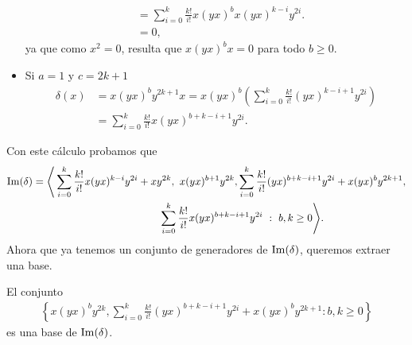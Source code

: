 \documentclass[fleqn,../tesis.tex]{subfiles}
\begin{document}
\begin{itemize}
\begin{align*}
		&= \sum_{i = 0}^k\frac{k!}{i!}x(yx)^bx(yx)^{k - i}y^{2i}. \\
		& = 0,
	\end{align*}
	ya que como $x^2 = 0$, resulta que $x(yx)^bx = 0$ para todo $b \geq 0$.
\item Si $a = 1$ y $c = 2k + 1$
	\begin{align*}
		\delta(x) &= x(yx)^by^{2k + 1}x = x(yx)^b\left( \sum_{i = 0}^k\frac{k!}{i!}(yx)^{k - i + 1}y^{2i}\right) \\
		&= \sum_{i = 0}^k\frac{k!}{i!}x(yx)^{b + k - i + 1}y^{2i}.
	\end{align*}
\end{itemize}
Con este cálculo probamos que
\begin{align*}
	\Ima(\delta) = \Bigg\langle &\sum_{i = 0}^k\frac{k!}{i!}x(yx)^{k - i}y^{2i} + xy^{2k},\ x(yx)^{b + 1}y^{2k},
		 \sum_{i = 0}^k\frac{k!}{i!}(yx)^{b + k - i + 1}y^{2i} + x(yx)^by^{2k + 1}, \\
		&\hspace{100pt}\sum_{i = 0}^k\frac{k!}{i!}x(yx)^{b + k - i + 1}y^{2i}\ :\ b,k \geq 0	\Bigg\rangle.
\end{align*}
Ahora que ya tenemos un conjunto de generadores de $\operatorname{Im}(\delta)$, queremos extraer una base.
\begin{prop}
\label{imdelta}
El conjunto
\begin{align*}
		\left\{ x(yx)^by^{2k},
			\sum_{i = 0}^k\frac{k!}{i!}(yx)^{b + k - i + 1}y^{2i} + x(yx)^by^{2k + 1} :b, k \geq 0 \right\}
\end{align*}
es una base de $\operatorname{Im}(\delta)$.
\end{prop}
\end{document}
